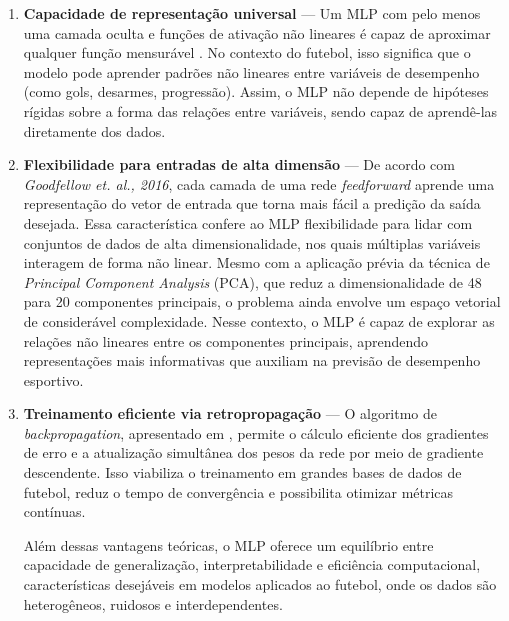 \begin{enumerate}
    \item \textbf{Capacidade de representação universal} —
    Um MLP com pelo menos uma camada oculta e funções de ativação não lineares é capaz de aproximar qualquer função mensurável \cite{Hornik1991}.
    No contexto do futebol, isso significa que o modelo pode aprender padrões não lineares entre variáveis de desempenho (como gols, desarmes, progressão). 
    Assim, o MLP não depende de hipóteses rígidas sobre a forma das relações entre variáveis, sendo capaz de aprendê-las diretamente dos dados.

    \item \textbf{Flexibilidade para entradas de alta dimensão} —
    De acordo com \textit{Goodfellow et. al., 2016}, cada camada de uma rede \textit{feedforward} aprende uma representação do vetor de entrada que torna mais fácil a predição da saída desejada. 
    Essa característica confere ao MLP flexibilidade para lidar com conjuntos de dados de alta dimensionalidade, nos quais múltiplas variáveis interagem de forma não linear. 
    Mesmo com a aplicação prévia da técnica de \textit{Principal Component Analysis} (PCA), que reduz a dimensionalidade de 48 para 20 componentes principais, o problema ainda envolve um espaço vetorial de considerável complexidade. 
    Nesse contexto, o MLP é capaz de explorar as relações não lineares entre os componentes principais, aprendendo representações mais informativas que auxiliam na previsão de desempenho esportivo.

    \item \textbf{Treinamento eficiente via retropropagação} — 
    O algoritmo de \textit{backpropagation}, apresentado em \cite{Goodfellow2016}, permite o cálculo eficiente dos gradientes de erro e a atualização simultânea dos pesos da rede por meio de gradiente descendente. 
    Isso viabiliza o treinamento em grandes bases de dados de futebol, reduz o tempo de convergência e possibilita otimizar métricas contínuas.

Além dessas vantagens teóricas, o MLP oferece um equilíbrio entre capacidade de generalização, interpretabilidade e eficiência computacional, características desejáveis em modelos aplicados ao futebol, onde os dados são heterogêneos, ruidosos e interdependentes.

\end{enumerate}
